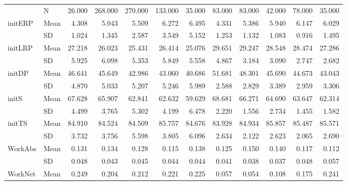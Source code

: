 \begin{longtable}{llrrrrrrrrrr}
\bottomrule
\endlastfoot
{} & N &     26.000 &    268.000 &    270.000 &    133.000 &     35.000 &     83.000 &     83.000 &     42.000 &     78.000 &     35.000 \\
\multirow{2}{*}{initERP} & Mean &      4.308 &      5.043 &      5.509 &      6.272 &      6.495 &      4.331 &      5.386 &      5.940 &      6.147 &      6.029 \\
   & SD &      1.024 &      1.345 &      2.587 &      3.549 &      5.152 &      1.253 &      1.132 &      1.083 &      0.916 &      1.495 \\
\cline{1-12}
\multirow{2}{*}{initLRP} & Mean &     27.218 &     26.023 &     25.431 &     26.414 &     25.076 &     29.651 &     29.247 &     28.548 &     28.474 &     27.286 \\
   & SD &      5.925 &      6.098 &      5.353 &      5.849 &      5.558 &      4.867 &      3.184 &      3.090 &      2.747 &      2.682 \\
\cline{1-12}
\multirow{2}{*}{initDP} & Mean &     46.641 &     45.649 &     42.986 &     43.060 &     40.686 &     51.681 &     48.301 &     45.690 &     44.673 &     43.043 \\
   & SD &      4.870 &      5.033 &      5.207 &      5.246 &      5.989 &      2.588 &      2.829 &      3.389 &      2.959 &      3.306 \\
\cline{1-12}
\multirow{2}{*}{initS} & Mean &     67.628 &     65.907 &     62.841 &     62.632 &     59.629 &     68.681 &     66.271 &     64.690 &     63.647 &     62.314 \\
   & SD &      4.499 &      3.765 &      5.302 &      4.199 &      6.478 &      2.220 &      1.556 &      2.734 &      1.455 &      1.582 \\
\cline{1-12}
\multirow{2}{*}{initTS} & Mean &     84.910 &     84.524 &     84.509 &     85.757 &     84.676 &     83.928 &     84.934 &     85.857 &     85.487 &     85.571 \\
   & SD &      3.732 &      3.756 &      5.598 &      3.805 &      6.096 &      2.634 &      2.122 &      2.623 &      2.065 &      2.690 \\
\cline{1-12}
\multirow{2}{*}{WorkAbs} & Mean &      0.131 &      0.134 &      0.128 &      0.115 &      0.138 &      0.125 &      0.150 &      0.140 &      0.117 &      0.112 \\
   & SD &      0.048 &      0.043 &      0.045 &      0.044 &      0.044 &      0.041 &      0.038 &      0.037 &      0.048 &      0.057 \\
\cline{1-12}
\multirow{2}{*}{WorkNet} & Mean &      0.249 &      0.204 &      0.212 &      0.221 &      0.225 &      0.057 &      0.054 &      0.108 &      0.175 &      0.241 \\

\end{longtable}
